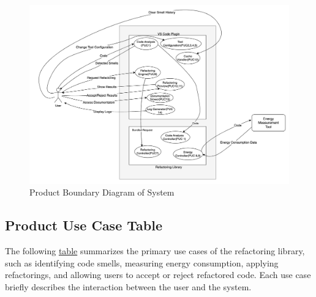 \documentclass[12pt]{article}
\begin{document}
\begin{figure}[H]
  \centering
  \includegraphics[width=1.1\textwidth]{../Images/product_boundary.png}
  \caption{Product Boundary Diagram of System}
  \label{img:prod-bound}
\end{figure}

\subsection{Product Use Case Table}
The following \hyperref[tab:puc]{table} summarizes the primary use
cases of the refactoring library, such as identifying code smells,
measuring energy consumption, applying refactorings, and allowing
users to accept or reject refactored code. Each use case briefly
describes the interaction between the user and the system.

\setlength\extrarowheight{2mm}
\end{document}
